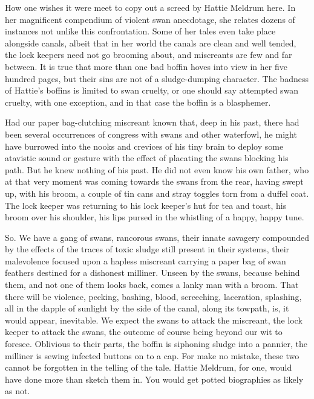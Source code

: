 How one wishes it were meet to copy out a screed by Hattie Meldrum here. In her magnificent compendium of violent swan anecdotage, she relates dozens of instances not unlike this confrontation. Some of her tales even take place alongside canals, albeit that in her world the canals are clean and well tended, the lock keepers need not go brooming about, and miscreants are few and far between. It is true that more than one bad boffin hoves into view in her five hundred pages, but their sins are not of a sludge-dumping character. The badness of Hattie's boffins is limited to swan cruelty, or one should say attempted swan cruelty, with one exception, and in that case the boffin is a blasphemer.

Had our paper bag-clutching miscreant known that, deep in his past, there had been several occurrences of congress with swans and other waterfowl, he might have burrowed into the nooks and crevices of his tiny brain to deploy some atavistic sound or gesture with the effect of placating the swans blocking his path. But he knew nothing of his past. He did not even know his own father, who at that very moment was coming towards the swans from the rear, having swept up, with his broom, a couple of tin cans and stray toggles torn from a duffel coat. The lock keeper was returning to his lock keeper's hut for tea and toast, his broom over his shoulder, his lips pursed in the whistling of a happy, happy tune.

So. We have a gang of swans, rancorous swans, their innate savagery compounded by the effects of the traces of toxic sludge still present in their systems, their malevolence focused upon a hapless miscreant carrying a paper bag of swan feathers destined for a dishonest milliner. Unseen by the swans, because behind them, and not one of them looks back, comes a lanky man with a broom. That there will be violence, pecking, bashing, blood, screeching, laceration, splashing, all in the dapple of sunlight by the side of the canal, along its towpath, is, it would appear, inevitable. We expect the swans to attack the miscreant, the lock keeper to attack the swans, the outcome of course being beyond our wit to foresee. Oblivious to their parts, the boffin is siphoning sludge into a pannier, the milliner is sewing infected buttons on to a cap. For make no mistake, these two cannot be forgotten in the telling of the tale. Hattie Meldrum, for one, would have done more than sketch them in. You would get potted biographies as likely as not.

